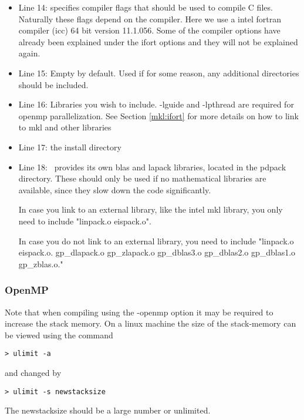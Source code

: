 \begin{itemize}
\item Line 14:  specifies compiler flags that should be used to compile C files. Naturally these flags depend on the compiler. Here we use a intel fortran compiler (icc) 64 bit version 11.1.056. Some of the compiler options have already been explained under the ifort options and they will not be explained again.
\item Line 15: Empty by default. Used if for some reason, any additional directories should be included.
\item Line 16: Libraries you wish to include. -lguide and -lpthread are required for openmp parallelization. See Section \ref{mkl:ifort} for more details on how to link to mkl and other libraries
\item Line 17: the install directory 
\item Line 18: \lsdalton\ provides its own blas and lapack libraries, located in the pdpack directory. These should only be used
if no mathematical libraries are available, since they slow down the code significantly. 

In case you link to an external library, like the intel mkl library, you only need to include "linpack.o eispack.o".

In case you do not link to an external library, you need to include "linpack.o eispack.o. gp\_dlapack.o gp\_zlapack.o gp\_dblas3.o gp\_dblas2.o gp\_dblas1.o gp\_zblas.o."
\end{itemize}

\subsubsection{OpenMP}
Note that when compiling using the -openmp option it may be required to increase the stack memory. On a linux machine the size of the stack-memory can be viewed using the command
\begin{verbatim}
> ulimit -a
\end{verbatim}
and changed by
\begin{verbatim}
> ulimit -s newstacksize
\end{verbatim}
The newstacksize should be a large number or unlimited.

